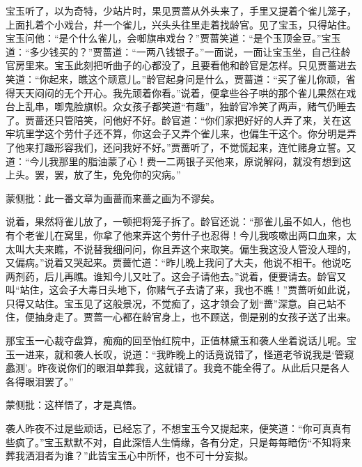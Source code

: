 \begin{parag}


    宝玉听了，以为奇特，少站片时，果见贾蔷从外头来了，手里又提着个雀儿笼子，上面扎着个小戏台，幷一个雀儿，兴头头往里走着找龄官。见了宝玉，只得站住。宝玉问他：“是个什么雀儿，会啣旗串戏台？”贾蔷笑道：“是个玉顶金豆。”宝玉道：“多少钱买的？”贾蔷道：“一两八钱银子。”一面说，一面让宝玉坐，自己往龄官房里来。宝玉此刻把听曲子的心都没了，且要看他和龄官是怎样。只见贾蔷进去笑道：“你起来，瞧这个顽意儿。”龄官起身问是什么，贾蔷道：“买了雀儿你顽，省得天天闷闷的无个开心。我先顽着你看。”说着，便拿些谷子哄的那个雀儿果然在戏台上乱串，啣鬼脸旗帜。众女孩子都笑道“有趣”，独龄官冷笑了两声，赌气仍睡去了。贾蔷还只管陪笑，问他好不好。龄官道：“你们家把好好的人弄了来，关在这牢坑里学这个劳什子还不算，你这会子又弄个雀儿来，也偏生干这个。你分明是弄了他来打趣形容我们，还问我好不好。”贾蔷听了，不觉慌起来，连忙赌身立誓。又道：“今儿我那里的脂油蒙了心！费一二两银子买他来，原说解闷，就没有想到这上头。罢，罢，放了生，免免你的灾病。”\begin{note}蒙侧批：此一番文章为画蔷而来蔷之画为不谬矣。\end{note}说着，果然将雀儿放了，一顿把将笼子拆了。龄官还说：“那雀儿虽不如人，他也有个老雀儿在窝里，你拿了他来弄这个劳什子也忍得！今儿我咳嗽出两口血来，太太叫大夫来瞧，不说替我细问问，你且弄这个来取笑。偏生我这没人管没人理的，又偏病。”说着又哭起来。贾蔷忙道：“昨儿晚上我问了大夫，他说不相干。他说吃两剂药，后儿再瞧。谁知今儿又吐了。这会子请他去。”说着，便要请去。龄官又叫“站住，这会子大毒日头地下，你赌气子去请了来，我也不瞧！”贾蔷听如此说，只得又站住。宝玉见了这般景况，不觉痴了，这才领会了划“蔷”深意。自己站不住，便抽身走了。贾蔷一心都在龄官身上，也不顾送，倒是别的女孩子送了出来。
\end{parag}


\begin{parag}


    那宝玉一心裁夺盘算，痴痴的回至怡红院中，正值林黛玉和袭人坐着说话儿呢。宝玉一进来，就和袭人长叹，说道：“我昨晚上的话竟说错了，怪道老爷说我是‘管窥蠡测’。昨夜说你们的眼泪单葬我，这就错了。我竟不能全得了。从此后只是各人各得眼泪罢了。”\begin{note}蒙侧批：这样悟了，才是真悟。\end{note}袭人昨夜不过是些顽话，已经忘了，不想宝玉今又提起来，便笑道：“你可真真有些疯了。”宝玉默默不对，自此深悟人生情缘，各有分定，只是每每暗伤“不知将来葬我洒泪者为谁？”此皆宝玉心中所怀，也不可十分妄拟。
\end{parag}


